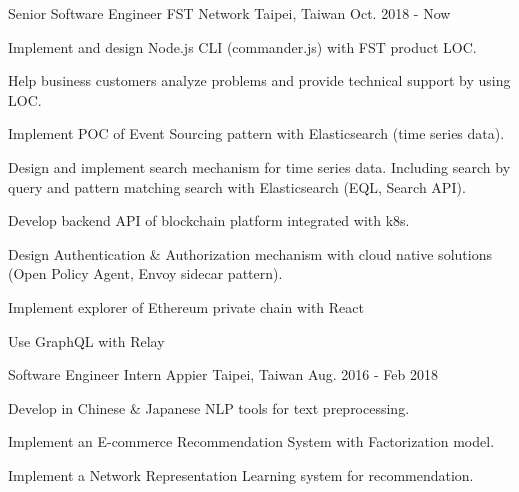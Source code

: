 

\begin{cventries}

	\cventry
	{Senior Software Engineer} %
	{FST Network} %
	{Taipei, Taiwan} %
	{Oct. 2018 - Now} %
	{
		\begin{cvitems} %
			\item {Implement and design Node.js CLI (commander.js) with FST product LOC.}
			\item {Help business customers analyze problems and provide technical support by using LOC.}
			\item {Implement POC of Event Sourcing pattern with Elasticsearch (time series data).}
			\item {Design and implement search mechanism for time series data. Including search by query and pattern matching search with Elasticsearch (EQL, Search API).}
			\item {Develop backend API of blockchain platform integrated with k8s.}
			\item {Design Authentication \& Authorization mechanism with cloud native solutions (Open Policy Agent, Envoy sidecar pattern).}
			\item {Implement explorer of Ethereum private chain with React}
			\item {Use GraphQL with Relay}
		\end{cvitems}
	}

	\cventry
	{Software Engineer Intern} %
	{Appier} %
	{Taipei, Taiwan} %
	{Aug. 2016 - Feb 2018} %
	{
		\begin{cvitems} %
			\item {Develop in Chinese \& Japanese NLP tools for text preprocessing.}
			\item {Implement an E-commerce Recommendation System with Factorization model.}
			\item {Implement a Network Representation Learning system for recommendation.}
		\end{cvitems}
	}


\end{cventries}
